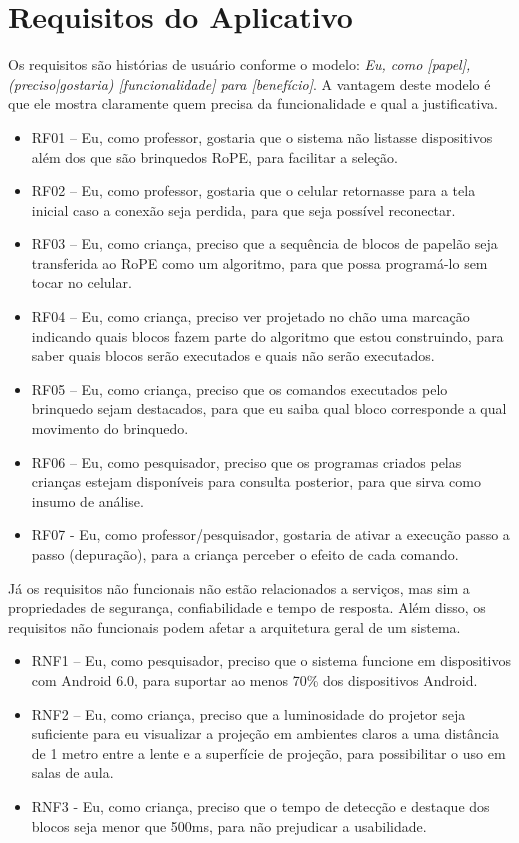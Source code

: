 \chapter{Requisitos do Aplicativo}
\label{apendice_requisitos}
Os requisitos são histórias de usuário conforme o modelo:
	\textit{Eu, como [papel], (preciso|gostaria) [funcionalidade] para [benefício]}.
A vantagem deste modelo é que ele mostra claramente quem precisa da funcionalidade e qual a justificativa. 

\begin{itemize}
\item RF01 – Eu, como professor, gostaria que o sistema não listasse dispositivos além dos que são brinquedos RoPE, para facilitar a seleção.
\item RF02 – Eu, como professor, gostaria que o celular retornasse para a tela inicial caso a conexão seja perdida, para que seja possível reconectar.
\item RF03 – Eu, como criança, preciso que a sequência de blocos de papelão seja transferida ao RoPE como um algoritmo, para que possa programá-lo sem tocar no celular.
\item RF04 – Eu, como criança, preciso ver projetado no chão uma marcação indicando quais blocos fazem parte do algoritmo que estou construindo, para saber quais blocos serão executados e quais não serão executados.
\item RF05 – Eu, como criança, preciso que os comandos executados pelo brinquedo sejam destacados, para que eu saiba qual bloco corresponde a qual movimento do brinquedo.
\item RF06 – Eu, como pesquisador, preciso que os programas criados pelas crianças estejam disponíveis para consulta posterior, para que sirva como insumo de análise. 
\item RF07 - Eu, como professor/pesquisador, gostaria de ativar a execução passo a passo (depuração), para a criança perceber o efeito de cada comando.
\end{itemize}

Já os requisitos não funcionais não estão relacionados a serviços, mas sim a propriedades de segurança, confiabilidade e tempo de resposta. Além disso, os requisitos não funcionais podem afetar a arquitetura geral de um sistema.

\begin{itemize}
    \item RNF1 – Eu, como pesquisador, preciso que o sistema funcione em dispositivos com Android 6.0, para suportar ao menos 70\% dos dispositivos Android.
    \item RNF2 – Eu, como criança, preciso que a luminosidade do projetor seja suficiente para eu visualizar a projeção em ambientes claros a uma distância de 1 metro entre a lente e a superfície de projeção, para possibilitar o uso em salas de aula.
    \item RNF3 - Eu, como criança, preciso que o tempo de detecção e destaque dos blocos seja menor que 500ms, para não prejudicar a usabilidade. 
\end{itemize}